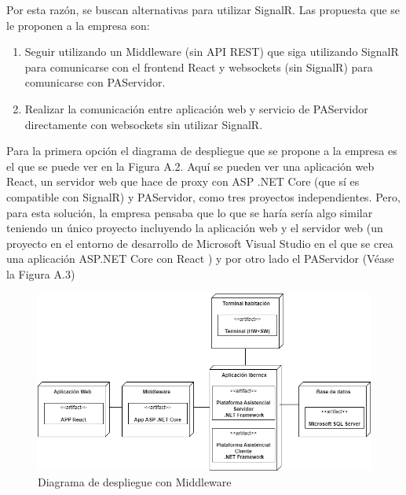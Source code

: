 Por esta razón, se buscan alternativas para utilizar SignalR. Las propuesta que se le proponen a la empresa son: 
\begin{enumerate}
    \item Seguir utilizando un Middleware (sin API REST) que siga utilizando SignalR para comunicarse con el frontend React y websockets (sin SignalR) para comunicarse con PAServidor.
    \item Realizar la comunicación entre aplicación web y servicio de PAServidor directamente con websockets sin utilizar SignalR.
\end{enumerate}

Para la primera opción el diagrama de despliegue que se propone a la empresa es el que se puede ver en la Figura A.2. Aquí se pueden ver una aplicación web React, un servidor web que hace de proxy con ASP .NET Core (que sí es compatible con SignalR) y PAServidor, como tres proyectos independientes. Pero, para esta solución, la empresa pensaba que lo que se haría sería algo similar teniendo un único proyecto incluyendo la aplicación web y el servidor web (un proyecto en el entorno de desarrollo de Microsoft Visual Studio en el que se crea una aplicación ASP.NET Core con React \cite{vs-project} ) y por otro lado el PAServidor (Véase la Figura A.3)\\

\begin{figure}[H]
    \centering
    \includegraphics[width=15cm]{Imagenes/Arquitectura-despliegue-2}
    \caption{Diagrama de despliegue con Middleware}
    \label{fig:despliegue-2}
\end{figure}



